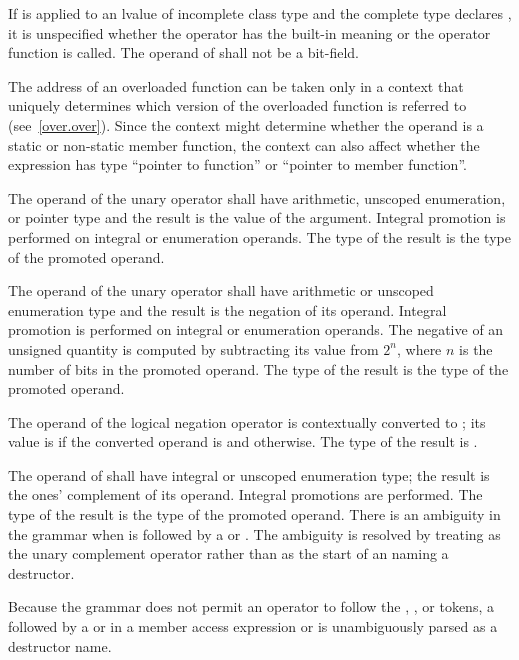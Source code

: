 \pnum
If \tcode{\&} is applied to an lvalue of incomplete class type and the
complete type declares , it is unspecified whether
the operator has the built-in meaning or the operator function is
called. The operand of \tcode{\&} shall not be a bit-field.

\pnum
{}%
\begin{note}
The address of an overloaded function can be taken
only in a context that uniquely determines which version of the
overloaded function is referred to (see~\ref{over.over}).
Since the context might determine whether the operand is a static or
non-static member function, the context can also affect whether the
expression has type ``pointer to function'' or ``pointer to member
function''.
\end{note}

\pnum
{}%
The operand of the unary \tcode{+} operator shall have arithmetic, unscoped
enumeration, or pointer type and the result is the value of the
argument. Integral promotion is performed on integral or enumeration
operands. The type of the result is the type of the promoted operand.

\pnum
{}%
The operand of the unary \tcode{-} operator shall have arithmetic or unscoped
enumeration type and the result is the negation of its operand. Integral
promotion is performed on integral or enumeration operands. The negative
of an unsigned quantity is computed by subtracting its value from $2^n$,
where $n$ is the number of bits in the promoted operand. The type of the
result is the type of the promoted operand.

\pnum
{}%
The operand of the logical negation operator \tcode{!} is contextually
converted to ;
its value is 
if the converted operand is  and  otherwise.
The type of the result is .

\pnum
{}%
%
The operand of \tcode{\~{}} shall have integral or unscoped enumeration type; the
result is the ones' complement of its operand. Integral promotions are
performed. The type of the result is the type of the promoted operand.
There is an ambiguity
in the grammar when \tcode{\~{}} is followed by
a  or .
The ambiguity is resolved by treating \tcode{\~{}} as the unary complement
operator rather than as the start of an 
naming a destructor.
\begin{note}
Because the grammar does not permit an operator to follow the
, \tcode{->}, or \tcode{::} tokens, a \tcode{\~{}} followed by
a  or  in a
member access expression or  is
unambiguously parsed as a destructor name.
\end{note}

